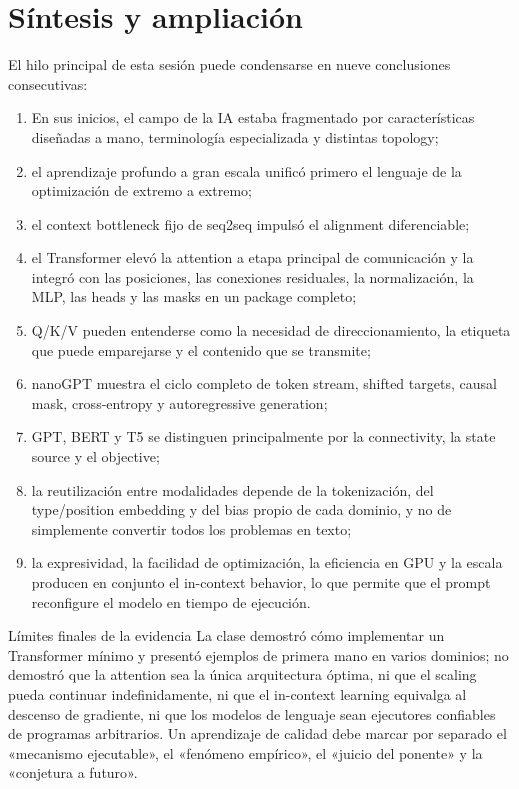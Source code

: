 \section{Síntesis y ampliación}

El hilo principal de esta sesión puede condensarse en nueve conclusiones consecutivas:

\begin{enumerate}
  \item En sus inicios, el campo de la IA estaba fragmentado por características diseñadas a mano, terminología especializada y distintas topology;
  \item el aprendizaje profundo a gran escala unificó primero el lenguaje de la optimización de extremo a extremo;
  \item el context bottleneck fijo de seq2seq impulsó el alignment diferenciable;
  \item el Transformer elevó la attention a etapa principal de comunicación y la integró con las posiciones, las conexiones residuales, la normalización, la MLP, las heads y las masks en un package completo;
  \item Q/K/V pueden entenderse como la necesidad de direccionamiento, la etiqueta que puede emparejarse y el contenido que se transmite;
  \item nanoGPT muestra el ciclo completo de token stream, shifted targets, causal mask, cross-entropy y autoregressive generation;
  \item GPT, BERT y T5 se distinguen principalmente por la connectivity, la state source y el objective;
  \item la reutilización entre modalidades depende de la tokenización, del type/position embedding y del bias propio de cada dominio, y no de simplemente convertir todos los problemas en texto;
  \item la expresividad, la facilidad de optimización, la eficiencia en GPU y la escala producen en conjunto el in-context behavior, lo que permite que el prompt reconfigure el modelo en tiempo de ejecución.
\end{enumerate}

\begin{warningbox}{Límites finales de la evidencia}
La clase demostró cómo implementar un Transformer mínimo y presentó ejemplos de primera mano en varios dominios; no demostró que la attention sea la única arquitectura óptima, ni que el scaling pueda continuar indefinidamente, ni que el in-context learning equivalga al descenso de gradiente, ni que los modelos de lenguaje sean ejecutores confiables de programas arbitrarios. Un aprendizaje de calidad debe marcar por separado el «mecanismo ejecutable», el «fenómeno empírico», el «juicio del ponente» y la «conjetura a futuro».
\end{warningbox}

